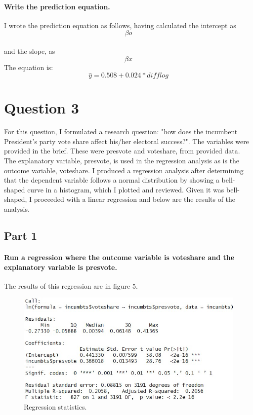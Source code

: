 \documentclass{article}
\begin{document}
\paragraph{Write the prediction equation.}
I wrote the prediction equation as follows, having calculated the intercept as 
\begin{equation}
	\beta o
\end{equation} 
\paragraph{}and the slope, as 
\begin{equation}
	\beta x
\end{equation}The equation is:
\begin{equation}
	\hat{y} = 0.508 + 0.024 * difflog
\end{equation}
\section{Question 3}

For this question, I formulated a research question: "how does the incumbent President's party vote share affect his/her electoral success?". The variables were provided in the brief. These were presvote and voteshare, from provided data. The explanatory variable, presvote, is used in the regression analysis as is the outcome variable, voteshare. I produced a regression analysis after determining that the dependent variable follows a normal distribution by showing a bell-shaped curve in a histogram, which I plotted and reviewed. Given it was bell-shaped, I proceeded with a linear regression and below are the results of the analysis.   
\subsection{Part 1}
\paragraph{Run a regression where the outcome variable is voteshare and the explanatory variable is presvote.}
The results of this regression are in figure 5.
\begin{figure}[H]
	\centering
	\includegraphics[width=0.9\linewidth]{Question3RegressionAnalysis.jpg}
	\caption{Regression statistics.}
	\label{fig:Regression statistics}
\end{figure}
\end{document}
